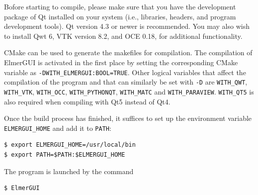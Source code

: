 Bofore starting to compile, please make sure that you have the development package of Qt
installed on your system (i.e., libraries, headers, and program development tools). Qt version 4.3
or newer is recommended. You may also wish to install Qwt 6,
VTK version 8.2,
and OCE 0.18, for additional functionality. 

CMake can be used to generate the makefiles for compilation. The compilation of ElmerGUI is activated 
in the first place by setting the corresponding CMake variable as {\tt -DWITH\_ELMERGUI:BOOL=TRUE}. 
Other logical variables that affect the compilation of the program and that can similarly be set 
with {\tt -D} are {\tt WITH\_QWT}, {\tt WITH\_VTK},
{\tt WITH\_OCC}, {\tt WITH\_PYTHONQT},
{\tt WITH\_MATC} and {\tt WITH\_PARAVIEW}. {\tt WITH\_QT5} is also required when compiling with Qt5 instead of Qt4.



Once the build process has finished, it suffices to set up the environment variable {\tt ELMERGUI\_HOME}
and add it to {\tt PATH}:
\begin{verbatim}
$ export ELMERGUI_HOME=/usr/local/bin
$ export PATH=$PATH:$ELMERGUI_HOME
\end{verbatim}
The program is launched by the command
\begin{verbatim}
$ ElmerGUI
\end{verbatim}




